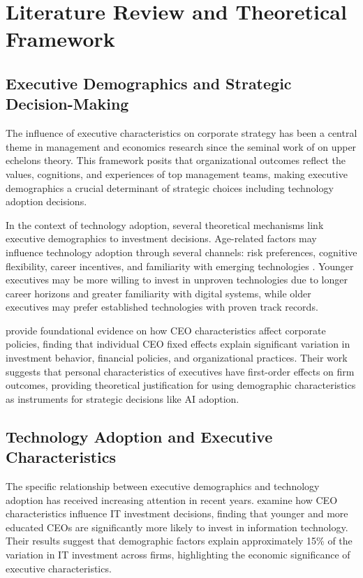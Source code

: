 \documentclass[12pt, a4paper]{article}
\begin{document}
\section{Literature Review and Theoretical Framework}

\subsection{Executive Demographics and Strategic Decision-Making}

The influence of executive characteristics on corporate strategy has been a central theme in management and economics research since the seminal work of \citet{hambrick2007upper} on upper echelons theory. This framework posits that organizational outcomes reflect the values, cognitions, and experiences of top management teams, making executive demographics a crucial determinant of strategic choices including technology adoption decisions.

In the context of technology adoption, several theoretical mechanisms link executive demographics to investment decisions. Age-related factors may influence technology adoption through several channels: risk preferences, cognitive flexibility, career incentives, and familiarity with emerging technologies \citep{serfling2014ceo}. Younger executives may be more willing to invest in unproven technologies due to longer career horizons and greater familiarity with digital systems, while older executives may prefer established technologies with proven track records.

\citet{bertrand2003managing} provide foundational evidence on how CEO characteristics affect corporate policies, finding that individual CEO fixed effects explain significant variation in investment behavior, financial policies, and organizational practices. Their work suggests that personal characteristics of executives have first-order effects on firm outcomes, providing theoretical justification for using demographic characteristics as instruments for strategic decisions like AI adoption.

\subsection{Technology Adoption and Executive Characteristics}

The specific relationship between executive demographics and technology adoption has received increasing attention in recent years. \citet{li2010ceo} examine how CEO characteristics influence IT investment decisions, finding that younger and more educated CEOs are significantly more likely to invest in information technology. Their results suggest that demographic factors explain approximately 15\% of the variation in IT investment across firms, highlighting the economic significance of executive characteristics.
\end{document}
